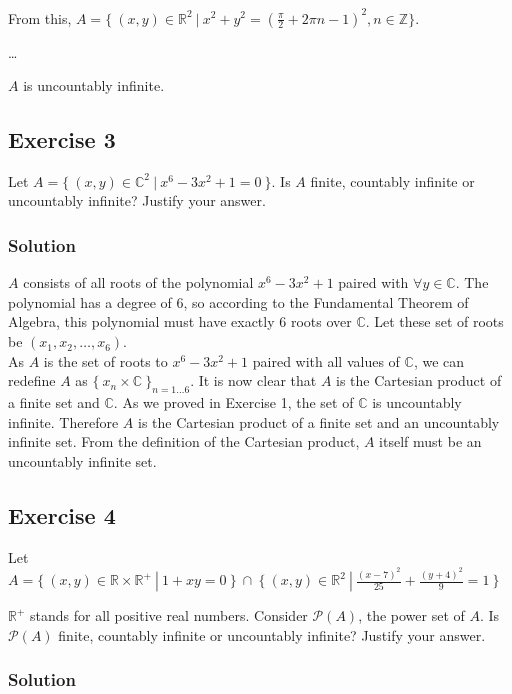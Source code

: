\documentclass[12pt]{article}
\begin{document}
From this, $A = \{\ (x,y) \in \mathbb{R}^{2}\ |\ x^{2} + y^{2} = {(\frac{\pi}{2} + 2 \pi n - 1)}^{2}, n \in \mathbb{Z} \}$.

\ldots

$A$ is uncountably infinite.

\subsection*{Exercise 3}

Let $A = \{\ (x,y) \in \mathbb{C}^{2}\ |\ x^{6} - 3x^{2} + 1 = 0\ \}$.
Is $A$ finite, countably infinite or uncountably infinite? Justify your answer.

\subsubsection*{Solution}

$A$ consists of all roots of the polynomial $x^{6} - 3x^{2} + 1$ paired with $\forall y \in \mathbb{C}$.
The polynomial has a degree of 6, so according to the Fundamental Theorem of Algebra, this polynomial must have exactly 6 roots over $\mathbb{C}$.
Let these set of roots be $(x_1, x_2, \ldots, x_6)$.
\\
As $A$ is the set of roots to $x^{6} - 3x^{2} + 1$ paired with all values of $\mathbb{C}$, we can redefine $A$ as $\{\ x_n \times \mathbb{C}\ \}_{n=1\ldots6}$.
It is now clear that $A$ is the Cartesian product of a finite set and $\mathbb{C}$.
As we proved in Exercise 1, the set of $\mathbb{C}$ is uncountably infinite.
Therefore $A$ is the Cartesian product of a finite set and an uncountably infinite set.
From the definition of the Cartesian product, $A$ itself must be an uncountably infinite set.

\newpage
\subsection*{Exercise 4}

Let $A = \{\ (x,y) \in \mathbb{R} \times \mathbb{R}^{+}\ |\ 1 + xy = 0\ \}\ \cap\ \{\ (x,y) \in \mathbb{R}^{2}\ |\ \frac{{(x - 7)}^{2}}{25} + \frac{{(y + 4)}^{2}}{9} = 1\ \}$

$\mathbb{R}^{+}$ stands for all positive real numbers. Consider $\mathcal{P}(A)$, the power set of $A$.
Is $\mathcal{P}(A)$ finite, countably infinite or uncountably infinite? Justify your answer.

\subsubsection*{Solution}
\end{document}
